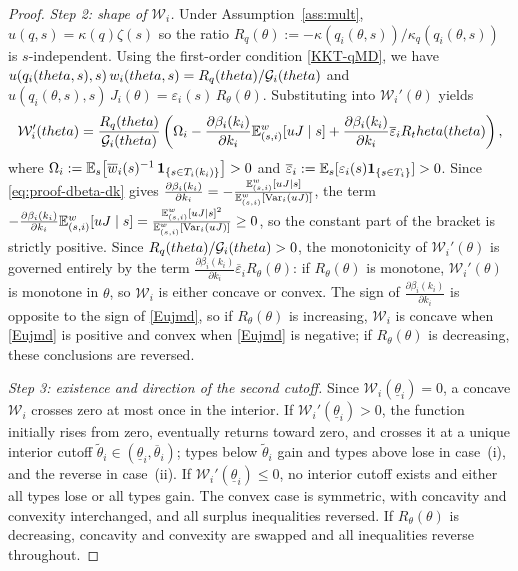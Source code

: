 \documentclass{class}
\begin{document}
\begin{proof}
\noindent\textit{Step 2: shape of $\mathcal W_i$.} Under Assumption~\ref{ass:mult}, $u(q,s)=\kappa(q)\zeta(s)$ so the ratio $R_q(\theta) := -\kappa(q_i(\theta,s))/\kappa_q(q_i(\theta,s))$ is $s$-independent. Using the first-order condition \ref{KKT-qMD}, we have $u(q_i(theta,s),s)\,w_i(theta,s) = R_q(theta)/\mathcal{G}_i(theta)$ and $u(q_i(\theta,s),s)\,J_i(\theta) = \varepsilon_i(s)\,R_\theta(\theta)$. Substituting into $\mathcal W_i'(\theta)$ yields
\[\mathcal W_i'(theta) = \frac{R_q(theta)}{\mathcal{G}_i(theta)}\left(\Omega_i - \frac{\partial \beta_i(k_i)}{\partial k_i}\mathbb{E}_{(s,i)}^w[uJ\mid s] + \frac{\partial \beta_i(k_i)}{\partial k_i} \overline \varepsilon_i R_theta(theta)\right),\]
where $\Omega_i:=\mathbb{E}_s\!\left[\overline w_i(s)^{-1}\,\mathbf{1}_{\{s\in T_i(k_i)\}}\right]>0$ and $ \overline \varepsilon_i := \mathbb{E}_s[\varepsilon_i(s)\mathbf 1_{\{s\in T_i\}}]>0$. Since \ref{eq:proof-dbeta-dk} gives $\frac{\partial \beta_i(k_i)}{\partial k_i} = -\frac{\mathbb{E}_{(s,i)}^w[uJ\mid s]}{\mathbb{E}_{(s,i)}^w[\mathrm{Var}_i(uJ)]}$, the term $-\frac{\partial \beta_i(k_i)}{\partial k_i}\mathbb{E}_{(s,i)}^w[uJ\mid s] = \frac{\mathbb{E}_{(s,i)}^w[uJ\mid s]^2}{\mathbb{E}_{(s,i)}^w[\mathrm{Var}_i(uJ)]}\ge 0$, so the constant part of the bracket is strictly positive. Since $R_q(theta)/\mathcal{G}_i(theta)>0$, the monotonicity of $\mathcal W_i'(\theta)$ is governed entirely by the term $\frac{\partial \beta_i(k_i)}{\partial k_i} \overline \varepsilon_i R_\theta(\theta)$: if $R_\theta(\theta)$ is monotone, $\mathcal W_i'(\theta)$ is monotone in $\theta$, so $\mathcal W_i$ is either concave or convex. The sign of $\frac{\partial \beta_i(k_i)}{\partial k_i}$ is opposite to the sign of \ref{Eujmd}, so if $R_\theta(\theta)$ is increasing, $\mathcal W_i$ is concave when \ref{Eujmd} is positive and convex when \ref{Eujmd} is negative; if $R_\theta(\theta)$ is decreasing, these conclusions are reversed.

\noindent\textit{Step 3: existence and direction of the second cutoff.} Since $\mathcal W_i(\underline\theta_i)=0$, a concave $\mathcal W_i$ crosses zero at most once in the interior. If $\mathcal W_i'(\underline\theta_i)>0$, the function initially rises from zero, eventually returns toward zero, and crosses it at a unique interior cutoff $\tilde\theta_i\in(\underline\theta_i,\overline\theta_i)$; types below $\tilde\theta_i$ gain and types above lose in case~(i), and the reverse in case~(ii). If $\mathcal W_i'(\underline\theta_i)\le 0$, no interior cutoff exists and either all types lose or all types gain. The convex case is symmetric, with concavity and convexity interchanged, and all surplus inequalities reversed. If $R_\theta(\theta)$ is decreasing, concavity and convexity are swapped and all inequalities reverse throughout.
\end{proof}
\end{document}
